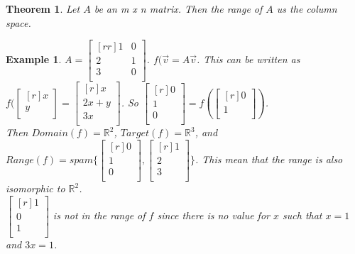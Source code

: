 \documentclass{report}
\newtheorem*{ex}{Example}
\newtheorem*{thrm}{Theorem}
\begin{document}
\begin{thrm}
Let $A$ be an m x n matrix. Then the range of $A$ us the column space.
\end{thrm}
\begin{ex}
$A=\begin{bmatrix}[rr]1&0\\2&1\\3&0\\\end{bmatrix}$. $f(\vec{v} = A\vec{v}$. This can be written as$f(\begin{bmatrix}[r]x\\y\\\end{bmatrix} = \begin{bmatrix}[r]x\\2x+y\\3x\\\end{bmatrix}$. So $\begin{bmatrix}[r]0\\1\\0\\\end{bmatrix} = f(\begin{bmatrix}[r]0\\1\\\end{bmatrix})$.\\
Then $Domain(f)=\mathbb{R}^2$, $Target(f)=\mathbb{R}^3$, and $Range(f)= spam\{\begin{bmatrix}[r]0\\1\\0\\\end{bmatrix},\begin{bmatrix}[r]1\\2\\3\\\end{bmatrix}\}$. This mean that the range is also isomorphic to $\mathbb{R}^2$.\\
$\begin{bmatrix}[r]1\\0\\1\\\end{bmatrix}$ is not in the range of $f$ since there is no value for $x$ such that $x=1$ and $3x=1$.\\


\end{ex}
\end{document}
